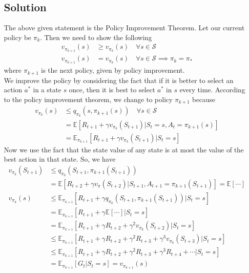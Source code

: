 \documentclass[11pt]{article}
\begin{document}
    \subsection*{Solution}
    The above given statement is the Policy Improvement Theorem. Let our current policy be $\pi_{k}$.
    Then we need to show the following
    \begin{align*}
        v_{\pi_{k+1}}(s) &\geq v_{\pi_{k}}(s) \quad \forall s \in \mathcal{S} \\
        v_{\pi_{k+1}}(s) &= v_{\pi_{k}}(s) \quad \forall s \in \mathcal{S} \implies \pi_{k} = \pi_{*}
    \end{align*}
    where $\pi_{k+1}$ is the next policy, given by policy improvement. \\
    We improve the policy by considering the fact that if it is better to select an action $a^{*}$ in
    a state $s$ once, then it is best to select $a^{*}$ in $s$ every time. According to the policy
    improvement theorem, we change to policy $\pi_{k+1}$ because
    \begin{align*}
        v_{\pi_{k}}(s) &\leq q_{\pi_{k}}(s, \pi_{k+1}(s)) \quad \forall s \in \mathcal{S} \\
        &= \mathbb{E}[R_{t+1} + \gamma v_{\pi_{k}}(S_{t+1}) | S_{t} = s, A_{t} = \pi_{k+1}(s)] \\
        &= \mathbb{E}_{\pi_{k+1}}[R_{t+1} + \gamma v_{\pi_{k}}(S_{t+1}) | S_{t} = s]
    \end{align*}
    Now we use the fact that the state value of any state is at most the value of the best action in that
    state. So, we have
    \begin{align*}
        v_{\pi_{k}}(S_{t+1}) &\leq q_{\pi_{k}}(S_{t+1}, \pi_{k+1}(S_{t+1})) \\
        &= \mathbb{E}[R_{t+2} + \gamma v_{\pi}(S_{t+2}) | S_{t+1}, A_{t+1} = \pi_{k+1}(S_{t+1})] = \mathbb{E}[\cdots] \\
        v_{\pi_{k}}(s) &\leq \mathbb{E}_{\pi_{k+1}}[R_{t+1} + \gamma q_{\pi_{k}}({S_{t+1}, \pi_{k+1}(S_{t+1})}) | S_{t} = s] \\
        &= \mathbb{E}_{\pi_{k+1}}[R_{t+1} + \gamma \mathbb{E}[\cdots] | S_{t} = s] \\
        &= \mathbb{E}_{\pi_{k+1}}[R_{t+1} + \gamma R_{t+2} + \gamma^{2} v_{\pi_{k}}(S_{t+2}) | S_{t} = s] \\
        &\leq \mathbb{E}_{\pi_{k+1}}[R_{t+1} + \gamma R_{t+2} + \gamma^{2} R_{t+3} + \gamma^{3} v_{\pi_{k}}(S_{t+3}) | S_{t} = s] \\
        &\leq \mathbb{E}_{\pi_{k+1}}[R_{t+1} + \gamma R_{t+2} + \gamma^{2} R_{t+3} + \gamma^{3} R_{t+4} + \cdots | S_{t} = s] \\
        &= \mathbb{E}_{\pi_{k+1}}[G_{t} | S_{t} = s] = v_{\pi_{k+1}}(s)
    \end{align*}
\end{document}
